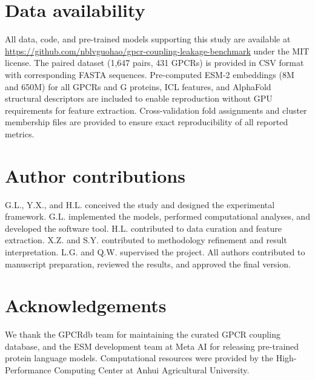 \documentclass[11pt,a4paper]{article}
\begin{document}
\section*{Data availability}

All data, code, and pre-trained models supporting this study are available at \url{https://github.com/nblvguohao/gpcr-coupling-leakage-benchmark} under the MIT license. The paired dataset (1,647 pairs, 431 GPCRs) is provided in CSV format with corresponding FASTA sequences. Pre-computed ESM-2 embeddings (8M and 650M) for all GPCRs and G proteins, ICL features, and AlphaFold structural descriptors are included to enable reproduction without GPU requirements for feature extraction. Cross-validation fold assignments and cluster membership files are provided to ensure exact reproducibility of all reported metrics.

\section*{Author contributions}

G.L., Y.X., and H.L. conceived the study and designed the experimental framework. G.L. implemented the models, performed computational analyses, and developed the software tool. H.L. contributed to data curation and feature extraction. X.Z. and S.Y. contributed to methodology refinement and result interpretation. L.G. and Q.W. supervised the project. All authors contributed to manuscript preparation, reviewed the results, and approved the final version.

\section*{Acknowledgements}

We thank the GPCRdb team for maintaining the curated GPCR coupling database, and the ESM development team at Meta AI for releasing pre-trained protein language models. Computational resources were provided by the High-Performance Computing Center at Anhui Agricultural University.
\end{document}
